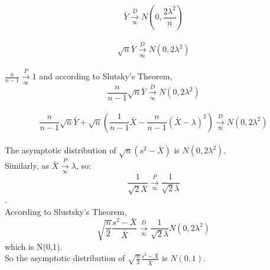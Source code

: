 \documentclass[11pt]{article}
\begin{document}
\begin{enumerate}
$$\bar{Y}\xrightarrow[\infty]{D} N(0,\frac{2\lambda^2}{n})$$\\
$$\sqrt{n}\bar{Y}\xrightarrow[\infty]{D} N(0,2\lambda^2)$$\\
$\frac{n}{n-1} \xrightarrow[\infty]{P} 1$ and according to Slutsky's Theorem,\\
$$\frac{n}{n-1}\sqrt{n}\bar{Y}\xrightarrow[\infty]{D} N(0,2\lambda^2)$$\\
$$\frac{n}{n-1}\sqrt{n}\bar{Y} + \sqrt{n}(\frac{1}{n-1} \bar{X} - \frac{n}{n-1} (\bar{X}-\lambda)^2)\xrightarrow[\infty]{D} N(0,2\lambda^2)$$\\
The asymptotic distribution of $\sqrt{n}(s^2 - \bar{X})$ is $N(0,2\lambda^2)$.\\
Similarly, as $\bar{X} \xrightarrow[\infty]{P} \lambda$, so:\\
$$\frac{1}{\sqrt{2} \bar{X}} \xrightarrow[\infty]{P} \frac{1}{\sqrt{2} \lambda}$$.\\
According to Slustsky's Theorem,\\
$$\sqrt{\frac{n}{2}} \frac{s^2 - \bar{X}}{\bar{X}} \xrightarrow[\infty]{D} \frac{1}{\sqrt{2} \lambda}N(0,2\lambda^2)$$
which is N(0,1).\\
So the asymptotic distribution of $\sqrt{\frac{n}{2}} \frac{s^2 - \bar{X}}{\bar{X}}$ is $N(0,1)$.


\end{enumerate}
\end{document}
